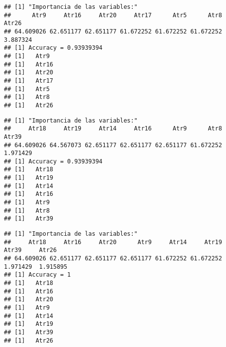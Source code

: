 \documentclass[
]{article}
\begin{document}
\begin{verbatim}
## [1] "Importancia de las variables:"
##      Atr9     Atr16     Atr20     Atr17      Atr5      Atr8     Atr26 
## 64.609026 62.651177 62.651177 61.672252 61.672252 61.672252  3.887324 
## [1] Accuracy = 0.93939394
## [1]   Atr9
## [1]   Atr16
## [1]   Atr20
## [1]   Atr17
## [1]   Atr5
## [1]   Atr8
## [1]   Atr26
\end{verbatim}

\begin{verbatim}
## [1] "Importancia de las variables:"
##     Atr18     Atr19     Atr14     Atr16      Atr9      Atr8     Atr39 
## 64.609026 64.567073 62.651177 62.651177 62.651177 61.672252  1.971429 
## [1] Accuracy = 0.93939394
## [1]   Atr18
## [1]   Atr19
## [1]   Atr14
## [1]   Atr16
## [1]   Atr9
## [1]   Atr8
## [1]   Atr39
\end{verbatim}

\begin{verbatim}
## [1] "Importancia de las variables:"
##     Atr18     Atr16     Atr20      Atr9     Atr14     Atr19     Atr39     Atr26 
## 64.609026 62.651177 62.651177 62.651177 61.672252 61.672252  1.971429  1.915895 
## [1] Accuracy = 1
## [1]   Atr18
## [1]   Atr16
## [1]   Atr20
## [1]   Atr9
## [1]   Atr14
## [1]   Atr19
## [1]   Atr39
## [1]   Atr26
\end{verbatim}
\end{document}
